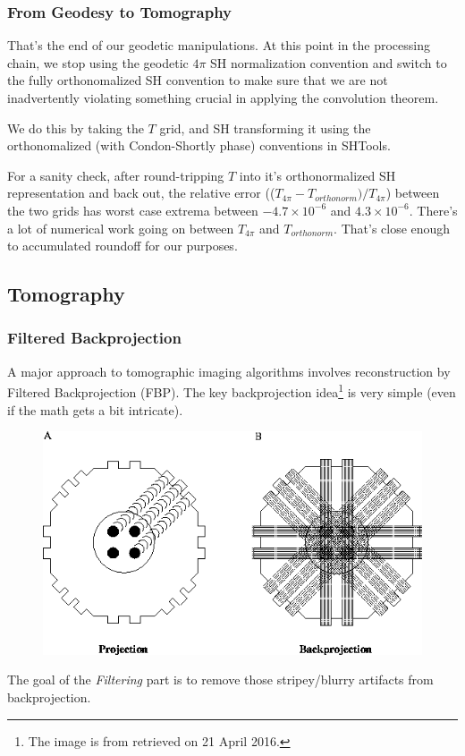 \documentclass[aspectratio=43,mathserif]{beamer}
\begin{document}
\begin{frame}
\frametitle{From Geodesy to Tomography}

That's the end of our geodetic manipulations. At this point in the processing chain, we stop using the geodetic \(4 \pi\) SH normalization convention and switch to the fully orthonomalized SH convention to make sure that we are not inadvertently violating something crucial in applying the convolution theorem.

We do this by taking the \(T\) grid, and SH transforming it using the orthonomalized (with Condon-Shortly phase) conventions in SHTools.

For a sanity check, after round-tripping \(T\) into it's orthonormalized SH representation and back out, the relative error ((\(T_{4\pi} - T_{orthonorm})/T_{4\pi}\)) between the two grids has worst case extrema between  \(-4.7 \times 10^{-6} \)  and  \(4.3 \times 10^{-6} \).  There's a lot of numerical work going on between \(T_{4\pi}\) and \(T_{orthonorm}\). That's close enough to accumulated roundoff for our purposes. 

\end{frame}

\subsection{Tomography}

\begin{frame}
\frametitle{Filtered Backprojection}
A major approach to tomographic imaging algorithms involves reconstruction by Filtered Backprojection (FBP). The key backprojection idea\footnote{The image is from  retrieved on 21 April 2016.} is very simple (even if the math gets a bit intricate).

\begin{figure}
\includegraphics[width=0.45\linewidth]{BackProjection.png}
\end{figure}
The goal of the \emph{Filtering} part is to remove those stripey/blurry artifacts from backprojection.

\end{frame}
\end{document}
